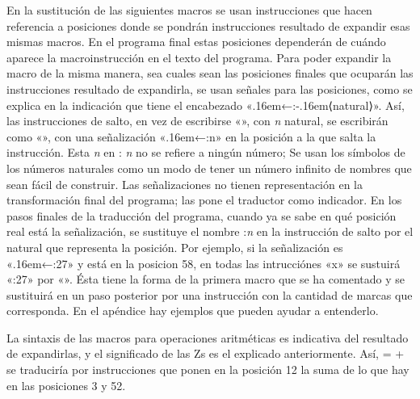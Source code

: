 En la sustitución de las siguientes macros se usan instrucciones que hacen referencia a posiciones
donde se pondrán instrucciones resultado de expandir esas mismas macros. En el programa final estas
posiciones dependerán de cuándo aparece la macroinstrucción en el texto del programa. Para poder
expandir la macro de la misma manera, sea cuales sean las posiciones finales que ocuparán las
instrucciones resultado de expandirla, se usan señales para las posiciones, como se explica en la
indicación que tiene el encabezado «{\kern.16em←\fcode:\kern-.16em⟨natural⟩}». Así, las
instrucciones de salto, en vez de escribirse «\estrella{}», con {\it n} natural,
se escribirán como «\estrella{}», con una señalización
«\kern.16em←{:\fcodenoterm n}» en la posición a la que salta la instrucción. Esta {\it n} en {:\it
n} no se refiere a ningún número; Se usan los símbolos de los números naturales como un modo de
tener un número infinito de nombres que sean fácil de construir. Las señalizaciones no tienen
representación en la transformación final del programa; las pone el traductor como indicador. En los
pasos finales de la traducción del programa, cuando ya se sabe en qué posición real está la
señalización, se sustituye el nombre {:\it n} en la instrucción de salto por el natural que
representa la posición. Por ejemplo, si la señalización es «\kern.16em←{\fcode:27}» y está en la
posicion 58, en todas las intrucciónes «{\fcodenoterm x}{}» se sustuirá «{\fcode:27}» por
«{}». Ésta tiene la forma de la primera macro que se ha comentado y se sustituirá en un
paso posterior por una instrucción con la cantidad de marcas que corresponda. En el apéndice hay
ejemplos que pueden ayudar a entenderlo.

La sintaxis de las macros para operaciones aritméticas es indicativa del resultado de expandirlas, y
el significado de las {\fcode Z} s es el explicado anteriormente. Así,%
\vskip-2pt\encaje
{} =  + 
\finencaje
se traduciría por instrucciones que ponen en la posición 12 la suma de lo que hay en las posiciones 3 y 52.

